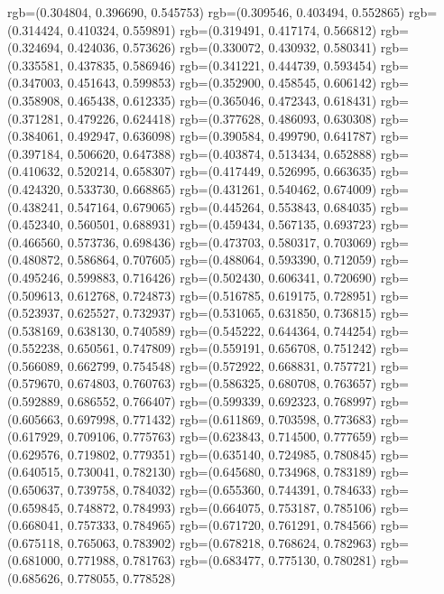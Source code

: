 {{{					rgb=(0.304804, 0.396690, 0.545753)
					rgb=(0.309546, 0.403494, 0.552865)
					rgb=(0.314424, 0.410324, 0.559891)
					rgb=(0.319491, 0.417174, 0.566812)
					rgb=(0.324694, 0.424036, 0.573626)
					rgb=(0.330072, 0.430932, 0.580341)
					rgb=(0.335581, 0.437835, 0.586946)
					rgb=(0.341221, 0.444739, 0.593454)
					rgb=(0.347003, 0.451643, 0.599853)
					rgb=(0.352900, 0.458545, 0.606142)
					rgb=(0.358908, 0.465438, 0.612335)
					rgb=(0.365046, 0.472343, 0.618431)
					rgb=(0.371281, 0.479226, 0.624418)
					rgb=(0.377628, 0.486093, 0.630308)
					rgb=(0.384061, 0.492947, 0.636098)
					rgb=(0.390584, 0.499790, 0.641787)
					rgb=(0.397184, 0.506620, 0.647388)
					rgb=(0.403874, 0.513434, 0.652888)
					rgb=(0.410632, 0.520214, 0.658307)
					rgb=(0.417449, 0.526995, 0.663635)
					rgb=(0.424320, 0.533730, 0.668865)
					rgb=(0.431261, 0.540462, 0.674009)
					rgb=(0.438241, 0.547164, 0.679065)
					rgb=(0.445264, 0.553843, 0.684035)
					rgb=(0.452340, 0.560501, 0.688931)
					rgb=(0.459434, 0.567135, 0.693723)
					rgb=(0.466560, 0.573736, 0.698436)
					rgb=(0.473703, 0.580317, 0.703069)
					rgb=(0.480872, 0.586864, 0.707605)
					rgb=(0.488064, 0.593390, 0.712059)
					rgb=(0.495246, 0.599883, 0.716426)
					rgb=(0.502430, 0.606341, 0.720690)
					rgb=(0.509613, 0.612768, 0.724873)
					rgb=(0.516785, 0.619175, 0.728951)
					rgb=(0.523937, 0.625527, 0.732937)
					rgb=(0.531065, 0.631850, 0.736815)
					rgb=(0.538169, 0.638130, 0.740589)
					rgb=(0.545222, 0.644364, 0.744254)
					rgb=(0.552238, 0.650561, 0.747809)
					rgb=(0.559191, 0.656708, 0.751242)
					rgb=(0.566089, 0.662799, 0.754548)
					rgb=(0.572922, 0.668831, 0.757721)
					rgb=(0.579670, 0.674803, 0.760763)
					rgb=(0.586325, 0.680708, 0.763657)
					rgb=(0.592889, 0.686552, 0.766407)
					rgb=(0.599339, 0.692323, 0.768997)
					rgb=(0.605663, 0.697998, 0.771432)
					rgb=(0.611869, 0.703598, 0.773683)
					rgb=(0.617929, 0.709106, 0.775763)
					rgb=(0.623843, 0.714500, 0.777659)
					rgb=(0.629576, 0.719802, 0.779351)
					rgb=(0.635140, 0.724985, 0.780845)
					rgb=(0.640515, 0.730041, 0.782130)
					rgb=(0.645680, 0.734968, 0.783189)
					rgb=(0.650637, 0.739758, 0.784032)
					rgb=(0.655360, 0.744391, 0.784633)
					rgb=(0.659845, 0.748872, 0.784993)
					rgb=(0.664075, 0.753187, 0.785106)
					rgb=(0.668041, 0.757333, 0.784965)
					rgb=(0.671720, 0.761291, 0.784566)
					rgb=(0.675118, 0.765063, 0.783902)
					rgb=(0.678218, 0.768624, 0.782963)
					rgb=(0.681000, 0.771988, 0.781763)
					rgb=(0.683477, 0.775130, 0.780281)
					rgb=(0.685626, 0.778055, 0.778528)
}}}
